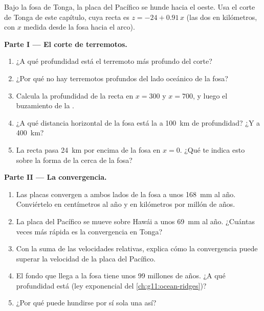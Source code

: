 \begin{problem}
\label{pb:g11:subduction-zones:1}
Bajo la fosa de Tonga, la placa del Pacífico se hunde hacia el oeste. Usa el
corte de Tonga de este capítulo, cuya recta es $z = -24 + 0.91\,x$ (las dos en
kilómetros, con $x$ medida desde la fosa hacia el arco).

\medskip
\noindent\textbf{Parte I --- El corte de terremotos.}
\begin{enumerate}
  \item ¿A qué profundidad está el terremoto más profundo del corte?
  \item ¿Por qué no hay terremotos profundos del lado oceánico de la fosa?
  \item Calcula la profundidad de la recta en $x = 300$ y $x = 700$, y luego
        el buzamiento de la .
  \item ¿A qué distancia horizontal de la fosa está la  a \qty{100}{km}
        de profundidad? ¿Y a \qty{400}{km}?
  \item La recta pasa \qty{24}{km} por encima de la fosa en $x = 0$. ¿Qué te
        indica esto sobre la forma de la  cerca de la fosa?
\end{enumerate}

\medskip
\noindent\textbf{Parte II --- La convergencia.}
\begin{enumerate}[resume]
  \item Las placas convergen a ambos lados de la fosa a unos \qty{168}{mm} al
        año. Conviértelo en centímetros al año y en kilómetros por millón de años.
  \item La placa del Pacífico se mueve sobre Hawái a unos \qty{69}{mm} al año.
        ¿Cuántas veces más rápida es la convergencia en Tonga?
  \item Con la suma de las velocidades relativas, explica cómo la
        convergencia puede superar la velocidad de la placa del Pacífico.
  \item El fondo que llega a la fosa tiene unos 99 millones de años. ¿A qué
        profundidad está (ley exponencial del \cref{ch:g11:ocean-ridges})?
  \item ¿Por qué puede hundirse por sí sola una  así?
\end{enumerate}


\end{problem}
